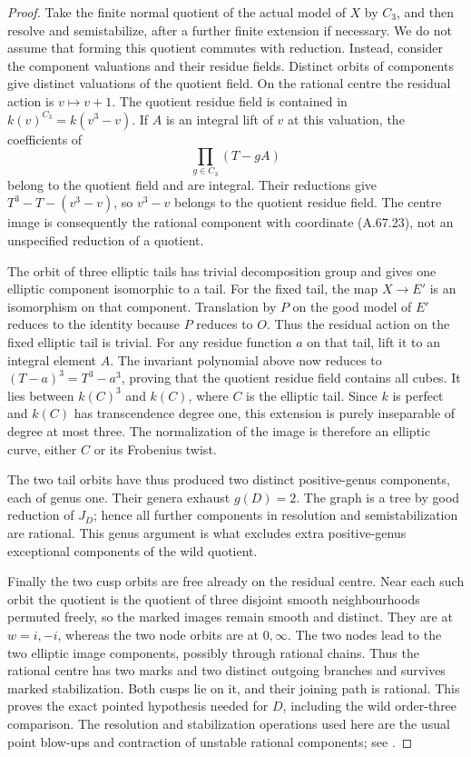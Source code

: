\begin{proof}
Take the finite normal quotient of the actual model of \(X\)
by \(C_3\), and then resolve and semistabilize, after a further
finite extension if necessary. We do not assume that forming
this quotient commutes with reduction. Instead, consider the
component valuations and their residue fields. Distinct
orbits of components give distinct valuations of the quotient
field. On the rational centre the residual action is
\(v\mapsto v+1\). The quotient residue field is contained in
\(k(v)^{C_3}=k(v^3-v)\). If \(A\) is an integral lift of \(v\)
at this valuation, the coefficients of
\[
                      \prod_{g\in C_3}(T-gA)
\]
belong to the quotient field and are integral. Their
reductions give \(T^3-T-(v^3-v)\), so \(v^3-v\) belongs to the
quotient residue field. The centre image is consequently
the rational component with coordinate (A.67.23), not an
unspecified reduction of a quotient.

The orbit of three elliptic tails has trivial decomposition
group and gives one elliptic component isomorphic to a tail.
For the fixed tail, the map \(X\to E'\) is an isomorphism on
that component. Translation by \(P\) on the good model of
\(E'\) reduces to the identity because \(P\) reduces to \(O\).
Thus the residual action on the fixed elliptic tail is
trivial. For any residue function \(a\) on that tail, lift it
to an integral element \(A\). The invariant polynomial above
now reduces to \((T-a)^3=T^3-a^3\), proving that the quotient
residue field contains all cubes. It lies between \(k(C)^3\)
and \(k(C)\), where \(C\) is the elliptic tail. Since \(k\)
is perfect and \(k(C)\) has transcendence degree one, this
extension is purely inseparable of degree at most three.
The normalization of the image is therefore an elliptic
curve, either \(C\) or its Frobenius twist.

The two tail orbits have thus produced two distinct
positive-genus components, each of genus one. Their genera
exhaust \(g(D)=2\). The graph is a tree by good reduction of
\(J_D\); hence all further components in resolution and
semistabilization are rational. This genus argument is what
excludes extra positive-genus exceptional components of the
wild quotient.

Finally the two cusp orbits are free already on the residual
centre. Near each such orbit the quotient is the quotient of
three disjoint smooth neighbourhoods permuted freely, so the
marked images remain smooth and distinct. They are at
\(w=i,-i\), whereas the two node orbits are at \(0,\infty\).
The two nodes lead to the two elliptic image components,
possibly through rational chains. Thus the rational centre
has two marks and two distinct outgoing branches and survives
marked stabilization. Both cusps lie on it, and their joining
path is rational. This proves the exact pointed hypothesis
needed for \(D\), including the wild order-three comparison.
The resolution and stabilization operations used here are
the usual point blow-ups and contraction of unstable rational
components; see \cite[9.2.5, 9.2.7, 10.4.24]{fghLiu}.


\end{proof}
